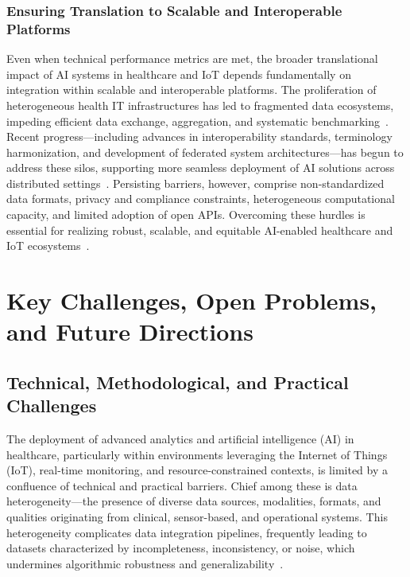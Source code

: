 \documentclass[sigconf]{acmart}
\begin{document}
\subsubsection{Ensuring Translation to Scalable and Interoperable Platforms}

Even when technical performance metrics are met, the broader translational impact of AI systems in healthcare and IoT depends fundamentally on integration within scalable and interoperable platforms. The proliferation of heterogeneous health IT infrastructures has led to fragmented data ecosystems, impeding efficient data exchange, aggregation, and systematic benchmarking~\cite{ref33,ref35,ref46,ref65}. Recent progress—including advances in interoperability standards, terminology harmonization, and development of federated system architectures—has begun to address these silos, supporting more seamless deployment of AI solutions across distributed settings~\cite{ref35,ref46,ref47}. Persisting barriers, however, comprise non-standardized data formats, privacy and compliance constraints, heterogeneous computational capacity, and limited adoption of open APIs. Overcoming these hurdles is essential for realizing robust, scalable, and equitable AI-enabled healthcare and IoT ecosystems~\cite{ref34,ref65}.

\section{Key Challenges, Open Problems, and Future Directions}

\subsection{Technical, Methodological, and Practical Challenges}

The deployment of advanced analytics and artificial intelligence (AI) in healthcare, particularly within environments leveraging the Internet of Things (IoT), real-time monitoring, and resource-constrained contexts, is limited by a confluence of technical and practical barriers. Chief among these is data heterogeneity—the presence of diverse data sources, modalities, formats, and qualities originating from clinical, sensor-based, and operational systems. This heterogeneity complicates data integration pipelines, frequently leading to datasets characterized by incompleteness, inconsistency, or noise, which undermines algorithmic robustness and generalizability~\cite{ref16,ref18,ref25,ref28,ref29,ref30,ref31,ref33,ref34,ref36,ref37,ref45,ref46,ref49,ref50,ref53,ref54,ref55,ref51,ref56,ref57,ref58,ref59,ref60,ref61,ref65,ref66,ref67,ref68,ref70,ref71,ref72,ref73,ref74,ref75,ref76,ref78,ref82,ref83,ref84,ref89,ref90,ref98,ref101,ref102,ref103,ref104,ref105,ref106,ref107}.
\end{document}

